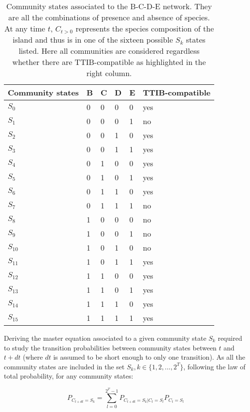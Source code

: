 \begin{table}[]
\centering
\caption[Community states associated to simple networks]{Community states associated to the B-C-D-E network. They are
all the combinations of presence and absence of species. At any time
\(t\), \(C_{t>0}\) represents the species composition of the island and
thus is in one of the sixteen possible \(S_k\) states listed. Here all
communities are considered regardless whether there are TTIB-compatible
as highlighted in the right column.}
\label{tabAnnIII_1}
  \begin{tabular}{|l|l|l|l|l|l|}
    Community states & B & C & D & E & TTIB-compatible \\ \hline
    \(S_{0}\) & 0 & 0 & 0 & 0 & yes \\
    \(S_{1}\) & 0 & 0 & 0 & 1 & no \\
    \(S_{2}\) & 0 & 0 & 1 & 0 & yes \\
    \(S_{3}\) & 0 & 0 & 1 & 1 & yes \\
    \(S_{4}\) & 0 & 1 & 0 & 0 & yes \\
    \(S_{5}\) & 0 & 1 & 0 & 1 & yes \\
    \(S_{6}\) & 0 & 1 & 1 & 0 & yes \\
    \(S_{7}\) & 0 & 1 & 1 & 1 & no \\
    \(S_{8}\) & 1 & 0 & 0 & 0 & no \\
    \(S_{9}\) & 1 & 0 & 0 & 1 & no \\
    \(S_{10}\) & 1 & 0 & 1 & 0 & no \\
    \(S_{11}\) & 1 & 0 & 1 & 1 & yes \\
    \(S_{12}\) & 1 & 1 & 0 & 0 & yes \\
    \(S_{13}\) & 1 & 1 & 0 & 1 & yes \\
    \(S_{14}\) & 1 & 1 & 1 & 0 & yes \\
    \(S_{15}\) & 1 & 1 & 1 & 1 & yes
  \end{tabular}
\end{table}


Deriving the master equation associated to a given community state
\(S_k\) required to study the transition probabilities between community
states between \(t\) and \(t+dt\) (where \(dt\) is assumed to be short enough
to  only one transition). As all the community states are included
in the set \(S_k, k\in\{1,2,...,2^T\}\), following the law of total
probability, for any community states:

\begin{equation}
P_{C_{t+dt}=S_{k}}= \sum_{l=0}^{2^T-1} P_{C_{t+dt}=S_k|C_{t}=S_l}P_{C_{t}=S_l}
\end{equation}

